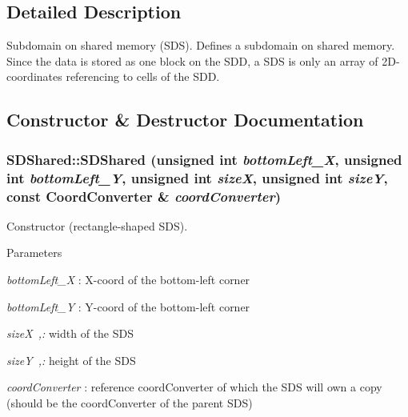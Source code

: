\subsection{Detailed Description}
Subdomain on shared memory (SDS). Defines a subdomain on shared memory. Since the data is stored as one block on the SDD, a SDS is only an array of 2D-\/coordinates referencing to cells of the SDD. 

\subsection{Constructor \& Destructor Documentation}
\hypertarget{classSDShared_a51004922c9fbb3f46dd5533dd95a3c12}{
\subsubsection[{SDShared}]{\setlength{\rightskip}{0pt plus 5cm}SDShared::SDShared (unsigned int {\em bottomLeft\_\-X}, \/  unsigned int {\em bottomLeft\_\-Y}, \/  unsigned int {\em sizeX}, \/  unsigned int {\em sizeY}, \/  const {\bf CoordConverter} \& {\em coordConverter})}}
\label{classSDShared_a51004922c9fbb3f46dd5533dd95a3c12}


Constructor (rectangle-\/shaped SDS). 
\begin{DoxyParams}{Parameters}
\item[{\em bottomLeft\_\-X}]: X-\/coord of the bottom-\/left corner \item[{\em bottomLeft\_\-Y}]: Y-\/coord of the bottom-\/left corner \item[{\em sizeX ,:}]width of the SDS \item[{\em sizeY ,:}]height of the SDS \item[{\em coordConverter}]: reference coordConverter of which the SDS will own a copy (should be the coordConverter of the parent SDS) \end{DoxyParams}


